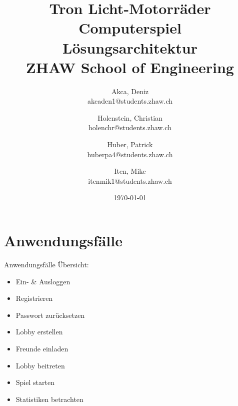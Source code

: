 \documentclass[11pt,ngerman]{article}
\begin{document}
    \title{Tron Licht-Motorräder Computerspiel\\
        \vspace{1cm}
        Lösungsarchitektur \\
        \vspace{0.5cm}
        \small{}ZHAW  School of Engineering
        \vspace{1.5cm}
    }
    \author{
        Akca, Deniz\\
        \small{akcaden1@students.zhaw.ch}
        \and
        Holenstein, Christian\\
        \small{holenchr@students.zhaw.ch}
        \and
        Huber, Patrick\\
        \small{huberpa4@students.zhaw.ch}
        \and
        Iten, Mike\\
        \small{itenmik1@students.zhaw.ch}
        \vspace{1.5cm}
    }
   \date{\today}

    \maketitle
    \newpage

    \tableofcontents
    \listoftables
    \listoffigures
    \newpage

    \section{Anwendungsfälle}
        Anwendungsfälle Übersicht:
        \begin{multicols}{2}
            \begin{itemize}
               \item Ein-  \& Ausloggen
               \item Registrieren
               \item Passwort zurücksetzen
               \item \Gls{Lobby} erstellen
               \item Freunde einladen
               \item \Gls{Lobby} beitreten
               \item Spiel starten
               \item Statistiken betrachten
           \end{itemize}
        \end{multicols}
\end{document}
